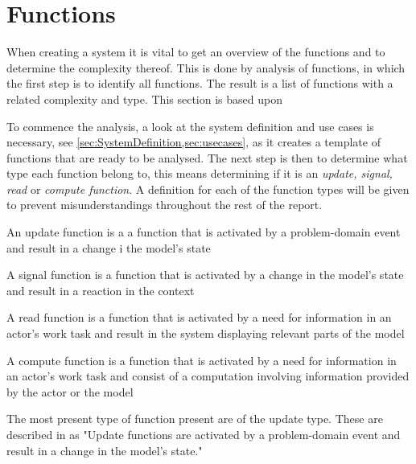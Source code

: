 \section{Functions}
When creating a system it is vital to get an overview of the functions and to determine the complexity thereof.
This is done by analysis of functions, in which the first step is to identify all functions.
The result is a list of functions with a related complexity and type.
This section is based upon\citep[ch.~7]{Rod-Aalborg}

To commence the analysis, a look at the system definition and use cases is necessary, see \cref{sec:SystemDefinition,sec:usecases}, as it creates a template of functions that are ready to be analysed.
The next step is then to determine what type each function belong to, this means determining if it is an \textit{update, signal, read} or \textit{compute function}.
A definition for each of the function types will be given to prevent misunderstandings throughout the rest of the report.

\begin{defn}
An update function is a a function that is activated by a problem-domain event and result in a change i the model's state
\end{defn}

\begin{defn}
A signal function is a function that is activated by a change in the model's state and result in a reaction in the context
\end{defn}

\begin{defn}
A read function is a function that is activated by a need for information in an actor's work task and result in the system displaying relevant parts of the model
\end{defn}

\begin{defn}
A compute function is a function that is activated by a need for information in an actor's work task and consist of a computation involving information provided by the actor or the model
\end{defn}

The most present type of function present are of the update type.
These are described in \citep[p.~140]{Rod-Aalborg}
as "Update functions are activated by a problem-domain event and result in a change in the model's state."\citep[p.~140]{Rod-Aalborg}

